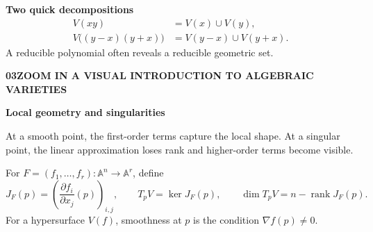 \documentclass[9pt,a4paper]{extarticle}
\DeclareMathOperator{\rank}{rank}
\newcommand{\A}{\mathbb{A}}
\newcommand{\footertext}{ALGEBRAIC VARIETIES}
\newcommand{\pagehead}[3]{%
  {\fontsize{7.2}{8}\selectfont\bfseries\color{teal}#1\quad #2\hfill
   \normalfont\color{muted}A VISUAL INTRODUCTION TO ALGEBRAIC VARIETIES}\par
  \vspace{2.5pt}{\color{line}\hrule height 0.45pt}\vspace{8pt}
  {\fontsize{21}{23}\selectfont\bfseries\color{navy}#3}\par\vspace{5pt}}
\newcommand{\lead}[1]{{\fontsize{11.2}{15.2}\selectfont #1\par}\vspace{6pt}}
\begin{document}
\vspace{5pt}
\begin{tealbox}
\textbf{Two quick decompositions}
\begin{align*}
V(xy)&=V(x)\cup V(y),\\
V\bigl((y-x)(y+x)\bigr)&=V(y-x)\cup V(y+x).
\end{align*}
A reducible polynomial often reveals a reducible geometric set.
\end{tealbox}
\newpage

\renewcommand{\footertext}{TANGENT SPACES / GRADIENTS / THE JACOBIAN}
\pagehead{03}{ZOOM IN}{Local geometry and singularities}
\lead{At a smooth point, the first-order terms capture the local shape. At a singular point, the linear approximation loses rank and higher-order terms become visible.}

\begin{mathbox}
For $F=(f_1,\ldots,f_r):\A^n\to\A^r$, define
\[
J_F(p)=\left(\frac{\partial f_i}{\partial x_j}(p)\right)_{i,j},
\qquad
T_pV=\ker J_F(p),
\qquad
\dim T_pV=n-\rank J_F(p).
\]
For a hypersurface $V(f)$, smoothness at $p$ is the condition $\nabla f(p)\neq0$.
\end{mathbox}
\end{document}

